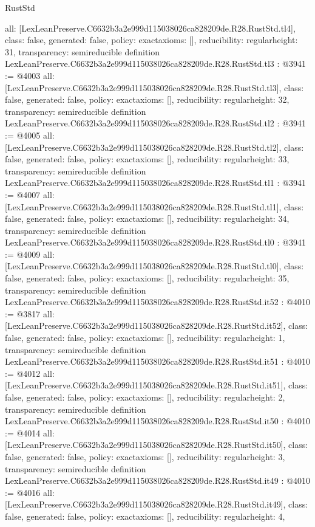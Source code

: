\begin{lexlean}{RustStd}
\begin{coremodule}
{  all: [LexLeanPreserve.C6632b3a2e999d115038026ca828209de.R28.RustStd.tl4],
  class: false,
  generated: false,
  policy: exact{axioms: []},
  reducibility: regular{height: 31},
  transparency: semireducible
}
definition LexLeanPreserve.C6632b3a2e999d115038026ca828209de.R28.RustStd.tl3 : @3941 := @4003 {
  all: [LexLeanPreserve.C6632b3a2e999d115038026ca828209de.R28.RustStd.tl3],
  class: false,
  generated: false,
  policy: exact{axioms: []},
  reducibility: regular{height: 32},
  transparency: semireducible
}
definition LexLeanPreserve.C6632b3a2e999d115038026ca828209de.R28.RustStd.tl2 : @3941 := @4005 {
  all: [LexLeanPreserve.C6632b3a2e999d115038026ca828209de.R28.RustStd.tl2],
  class: false,
  generated: false,
  policy: exact{axioms: []},
  reducibility: regular{height: 33},
  transparency: semireducible
}
definition LexLeanPreserve.C6632b3a2e999d115038026ca828209de.R28.RustStd.tl1 : @3941 := @4007 {
  all: [LexLeanPreserve.C6632b3a2e999d115038026ca828209de.R28.RustStd.tl1],
  class: false,
  generated: false,
  policy: exact{axioms: []},
  reducibility: regular{height: 34},
  transparency: semireducible
}
definition LexLeanPreserve.C6632b3a2e999d115038026ca828209de.R28.RustStd.tl0 : @3941 := @4009 {
  all: [LexLeanPreserve.C6632b3a2e999d115038026ca828209de.R28.RustStd.tl0],
  class: false,
  generated: false,
  policy: exact{axioms: []},
  reducibility: regular{height: 35},
  transparency: semireducible
}
definition LexLeanPreserve.C6632b3a2e999d115038026ca828209de.R28.RustStd.it52 : @4010 := @3817 {
  all: [LexLeanPreserve.C6632b3a2e999d115038026ca828209de.R28.RustStd.it52],
  class: false,
  generated: false,
  policy: exact{axioms: []},
  reducibility: regular{height: 1},
  transparency: semireducible
}
definition LexLeanPreserve.C6632b3a2e999d115038026ca828209de.R28.RustStd.it51 : @4010 := @4012 {
  all: [LexLeanPreserve.C6632b3a2e999d115038026ca828209de.R28.RustStd.it51],
  class: false,
  generated: false,
  policy: exact{axioms: []},
  reducibility: regular{height: 2},
  transparency: semireducible
}
definition LexLeanPreserve.C6632b3a2e999d115038026ca828209de.R28.RustStd.it50 : @4010 := @4014 {
  all: [LexLeanPreserve.C6632b3a2e999d115038026ca828209de.R28.RustStd.it50],
  class: false,
  generated: false,
  policy: exact{axioms: []},
  reducibility: regular{height: 3},
  transparency: semireducible
}
definition LexLeanPreserve.C6632b3a2e999d115038026ca828209de.R28.RustStd.it49 : @4010 := @4016 {
  all: [LexLeanPreserve.C6632b3a2e999d115038026ca828209de.R28.RustStd.it49],
  class: false,
  generated: false,
  policy: exact{axioms: []},
  reducibility: regular{height: 4},
}
\end{coremodule}
\end{lexlean}
